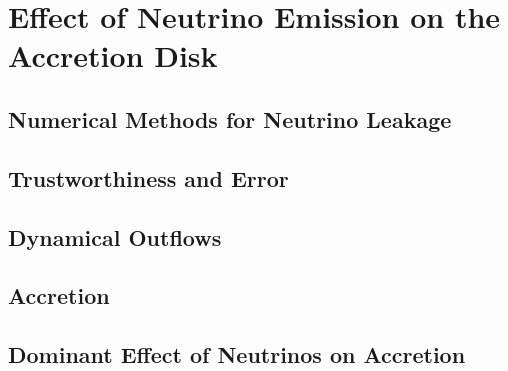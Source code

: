 \chapter{Effect of Neutrino Emission on the Accretion Disk}
\label{chap:leak}

\section{Numerical Methods for Neutrino Leakage}

\section{Trustworthiness and Error}

\section{Dynamical Outflows}

\section{Accretion}

\section{Dominant Effect of Neutrinos on Accretion}
